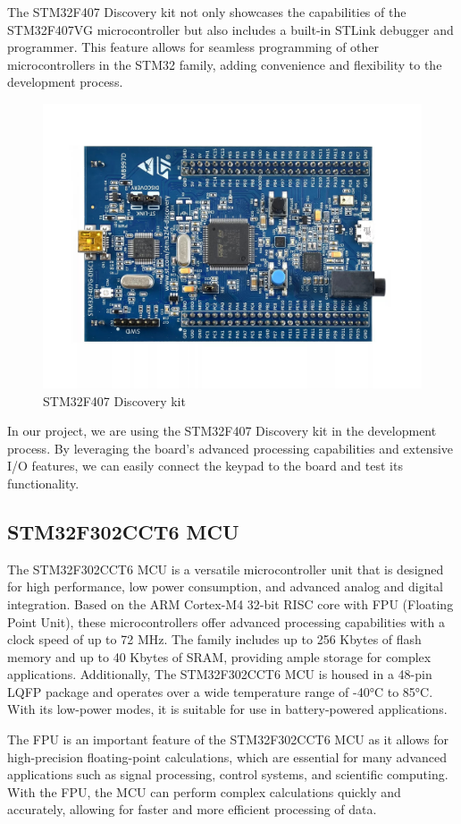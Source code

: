 \documentclass[a4paper, twoside]{report}
\begin{document}
The STM32F407 Discovery kit not only showcases the capabilities of the STM32F407VG microcontroller but also includes a built-in STLink debugger and programmer. This feature allows for seamless programming of other microcontrollers in the STM32 family, adding convenience and flexibility to the development process.

\newpage
\begin{figure}[H]
    \begin{center}
    \includegraphics[trim=0cm 6cm 0cm 5cm,clip,width=.6\textwidth]{images/MCU/stm32f4-discovery-3.jpeg}
    \caption{STM32F407 Discovery kit}
    \end{center}
\end{figure} 

In our project, we are using the STM32F407 Discovery kit in the development process. By leveraging the board's advanced processing capabilities and extensive I/O features, we can easily connect the keypad to the board and test its functionality. 

\subsection{STM32F302CCT6 MCU}
The STM32F302CCT6 MCU is a versatile microcontroller unit that is designed for high performance, low power consumption, and advanced analog and digital integration. Based on the ARM Cortex-M4 32-bit RISC core with FPU (Floating Point Unit), these microcontrollers offer advanced processing capabilities with a clock speed of up to 72 MHz. The family includes up to 256 Kbytes of flash memory and up to 40 Kbytes of SRAM, providing ample storage for complex applications. Additionally, The STM32F302CCT6 MCU is housed in a 48-pin LQFP package and operates over a wide temperature range of -40°C to 85°C. With its low-power modes, it is suitable for use in battery-powered applications.

The FPU is an important feature of the STM32F302CCT6 MCU as it allows for high-precision floating-point calculations, which are essential for many advanced applications such as signal processing, control systems, and scientific computing. With the FPU, the MCU can perform complex calculations quickly and accurately, allowing for faster and more efficient processing of data.
\end{document}

